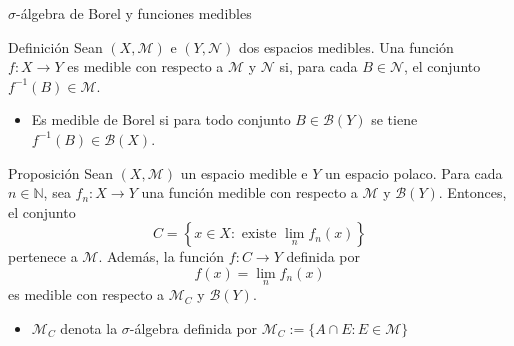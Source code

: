 \documentclass[8pt]{beamer}
\begin{document}
\begin{frame}{$\sigma$-álgebra de Borel y funciones medibles}
 
    \begin{block}{Definición}
            Sean $(X, \mathcal{M})$ e $(Y, \mathcal{N})$ dos espacios medibles. Una función $f:X \longrightarrow Y$ es medible con respecto a $\mathcal{M}$ y  $\mathcal{N}$ si, para cada $B \in \mathcal{N}$, el conjunto $f^{-1}(B) \in \mathcal{M}$. 
    \end{block}
    \begin{itemize}
        \item Es medible de Borel si para todo conjunto $B \in \mathcal B (Y)$ se tiene $f^{-1}(B) \in \mathcal{
B}(X)$.
    \end{itemize}
\pause
    \begin{block}{Proposición}
            Sean $(X, \mathcal{M})$ un espacio medible e $Y$ un espacio polaco. Para cada $n \in \mathbb{N}$, sea $f_n: X \longrightarrow Y$ una función medible con respecto a $\mathcal{M}$ y $\mathcal{B}(Y)$. Entonces, el conjunto 
    \begin{equation*}
        C=\left\{x\in X: \text{ existe } \lim_n f_n(x)\right\}
    \end{equation*}
    pertenece a $\mathcal{M}$. Además, la función $f:C \longrightarrow Y$ definida por 
    \begin{equation*}
        f(x) = \lim_n f_n(x)
    \end{equation*}
    es medible con respecto a $\mathcal{M}_C$ y $\mathcal{B}(Y)$. 
    \end{block}
    \begin{itemize}
        \item $\mathcal{M}_C$ denota la $\sigma$-álgebra definida por $\mathcal{M}_C := \{A \cap E: E \in \mathcal{M}\}$ 
    \end{itemize}
\end{frame}
\end{document}
